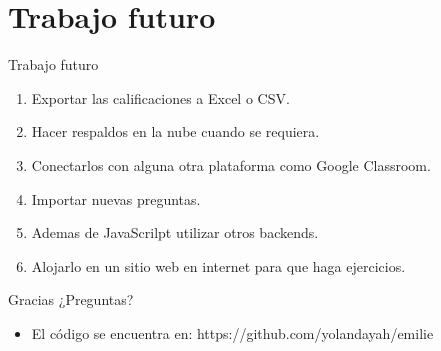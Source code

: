 \section{Trabajo futuro}

\begin{frame}[c]{Trabajo futuro}
  \begin{enumerate}
    \item Exportar las calificaciones a Excel o CSV.
    \item Hacer respaldos en la nube cuando se requiera.
    \item Conectarlos con alguna otra plataforma como Google Classroom.
    \item Importar nuevas preguntas.
    \item Ademas de JavaScrilpt utilizar otros backends.
    \item Alojarlo en un sitio web en internet para que haga ejercicios.
  \end{enumerate}
\end{frame}

\begin{frame}[c]{Gracias}
  ¿Preguntas?
  \begin{itemize}
    \item El código se encuentra en: https://github.com/yolandayah/emilie
  \end{itemize}
\end{frame}
